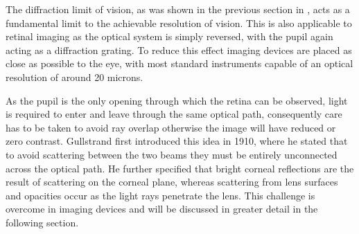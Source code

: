 The diffraction limit of vision, as was shown in the previous section in
, acts as a fundamental limit to the achievable resolution
of vision. This is also applicable to retinal imaging as the optical system is
simply reversed, with  the pupil again acting as a diffraction grating. To reduce
this effect imaging devices are placed as close as possible to the eye, with most
standard instruments capable of an optical resolution of around 20 microns.

As the pupil is the only opening through which the retina can be
observed, light is required to enter and leave through the same
optical path, consequently care has to be taken to avoid ray overlap
otherwise the image will have reduced or zero contrast. Gullstrand
first introduced this idea in 1910, where he stated that to avoid
scattering between the two beams they must be entirely unconnected
across the optical path.\cite{gullstrandcamera} He further specified that
bright corneal reflections are the result of scattering on the corneal plane,
whereas scattering from lens surfaces and opacities occur as the
light rays penetrate the lens. This challenge is overcome in
imaging devices and will be discussed in greater detail in the
following section.
